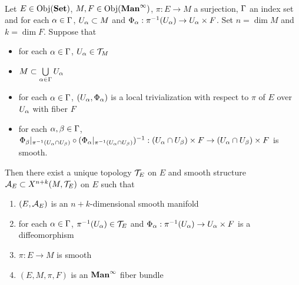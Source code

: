 \documentclass{book}
\begin{document}
	\begin{ex}  \\
		Let $E \in \operatorname{Obj}(\operatorname*{\text{\textbf{Set}}})$, $M, F \in \operatorname{Obj}(\operatorname*{\text{\textbf{Man}}^{\infty}})$, $\pi: E \rightarrow M$ a surjection, $\Gamma$ an index set and for each $\alpha \in \Gamma$, $U_{\alpha} \subset M$ and $\Phi_{\alpha}: \pi^{-1}(U_{\alpha}) \rightarrow U_{\alpha} \times F$. Set $n = \dim M$ and $k = \dim F$. Suppose that 
		\begin{itemize}
			\item for each $\alpha \in \Gamma$, $U_{\alpha} \in \mathcal{T}_M$
			\item $M \subset \bigcup\limits_{\alpha \in \Gamma} U_{\alpha}$ 
			\item for each $\alpha \in \Gamma$, $(U_{\alpha}, \Phi_{\alpha})$ is a local trivialization with respect to $\pi$ of $E$ over $U_{\alpha}$ with fiber $F$ 
			\item for each $\alpha,\beta \in \Gamma$, $\Phi_{\beta}|_{\pi^{-1}(U_{\alpha} \cap U_{\beta})} \circ (\Phi_{\alpha}|_{\pi^{-1}(U_{\alpha} \cap U_{\beta})})^{-1}: (U_{\alpha} \cap U_{\beta}) \times F \rightarrow  (U_{\alpha} \cap U_{\beta}) \times F$ is smooth.
		\end{itemize}
		Then there exist a unique topology $\mathcal{T}_E$ on $E$ and smooth structure $\mathcal{A}_E \subset X^{n+k}(M, \mathcal{T}_E)$ on $E$ such that
		\begin{enumerate}
			\item $(E, \mathcal{A}_E)$ is an $n+k$-dimensional smooth manifold 
			\item for each $\alpha \in \Gamma$, $ \pi^{-1}(U_{\alpha}) \in \mathcal{T}_E$ and $\Phi_{\alpha}: \pi^{-1}(U_{\alpha}) \rightarrow U_{\alpha} \times F$ is a diffeomorphism
			\item $\pi: E \rightarrow M$ is smooth
			\item $(E, M, \pi, F)$ is an $\operatorname*{\text{\textbf{Man}}^{\infty}}$ fiber bundle
		\end{enumerate}
	\end{ex}
\end{document}
